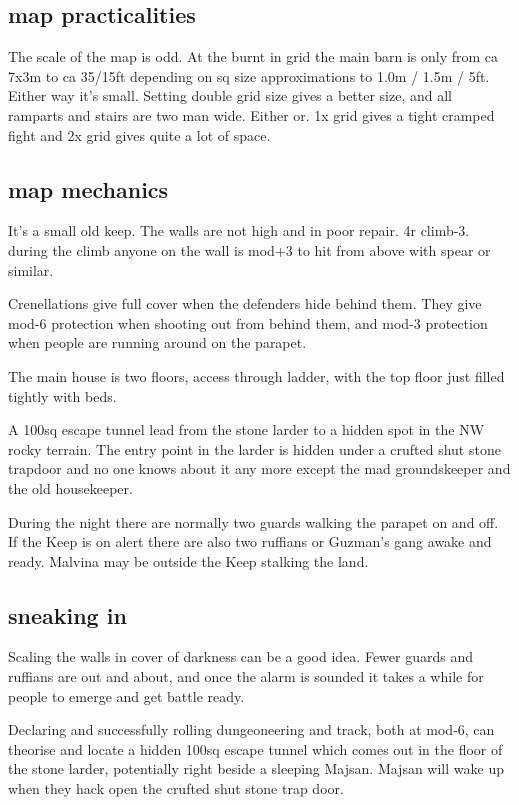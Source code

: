 \subsection*{map practicalities}
The scale of the map is odd. At the burnt in grid the main barn is only from ca 7x3m to ca 35/15ft depending on sq size approximations to 1.0m / 1.5m / 5ft. Either way it's small. Setting double grid size gives a better size, and all ramparts and stairs are two man wide.
Either or. 1x grid gives a tight cramped fight and 2x grid gives quite a lot of space.


\subsection*{map mechanics}
It's a small old keep. The walls are not high and in poor repair. 4r climb-3. during the climb anyone on the wall is mod+3 to hit from above with spear or similar.

Crenellations give full cover when the defenders hide behind them. They give mod-6 protection when shooting out from behind them, and mod-3 protection when people are running around on the parapet.

The main house is two floors, access through ladder, with the top floor just filled tightly with beds.

A 100sq escape tunnel lead from the stone larder to a hidden spot in the NW rocky terrain. The entry point in the larder is hidden under a crufted shut stone trapdoor and no one knows about it any more except the mad groundskeeper and the old housekeeper.

During the night there are normally two guards walking the parapet on and off. If the Keep is on alert there are also two ruffians or Guzman's gang awake and ready. Malvina may be outside the Keep stalking the land.


\subsection*{sneaking in}
Scaling the walls in cover of darkness can be a good idea. Fewer guards and ruffians are out and about, and once the alarm is sounded it takes a while for people to emerge and get battle ready.

Declaring and successfully rolling dungeoneering and track, both at mod-6, can theorise and locate a hidden 100sq escape tunnel which comes out in the floor of the stone larder, potentially right beside a sleeping Majsan. Majsan will wake up when they hack open the crufted shut stone trap door.

